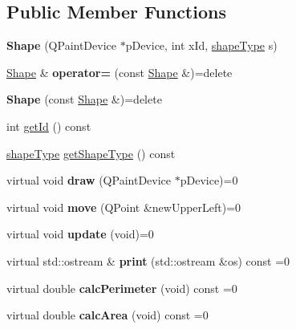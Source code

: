 \subsection*{Public Member Functions}
\begin{DoxyCompactItemize}
\item 
\hypertarget{classShape_a299b81fd56576b079f942a6a2c2f64e7}{{\bfseries Shape} (Q\-Paint\-Device $\ast$p\-Device, int x\-Id, \hyperlink{classShape_aaac58aa2f6760d0f06ec1710d5123e9b}{shape\-Type} s)}\label{classShape_a299b81fd56576b079f942a6a2c2f64e7}

\item 
\hypertarget{classShape_a9b9942917d6e6c359a8751156ed52423}{\hyperlink{classShape}{Shape} \& {\bfseries operator=} (const \hyperlink{classShape}{Shape} \&)=delete}\label{classShape_a9b9942917d6e6c359a8751156ed52423}

\item 
\hypertarget{classShape_a44d91c7621d4d7af60fe3320a2e07279}{{\bfseries Shape} (const \hyperlink{classShape}{Shape} \&)=delete}\label{classShape_a44d91c7621d4d7af60fe3320a2e07279}

\item 
int \hyperlink{classShape_a8783318515d368f9ba7b8f73a343e59b}{get\-Id} () const 
\item 
\hyperlink{classShape_aaac58aa2f6760d0f06ec1710d5123e9b}{shape\-Type} \hyperlink{classShape_a76eade96838eac557423a4ca8c0d9aef}{get\-Shape\-Type} () const 
\item 
\hypertarget{classShape_a0605dd98087b8566090acd67dc71eaa9}{virtual void {\bfseries draw} (Q\-Paint\-Device $\ast$p\-Device)=0}\label{classShape_a0605dd98087b8566090acd67dc71eaa9}

\item 
\hypertarget{classShape_a7314802497e54a2e3394eb5c9eacf06c}{virtual void {\bfseries move} (Q\-Point \&new\-Upper\-Left)=0}\label{classShape_a7314802497e54a2e3394eb5c9eacf06c}

\item 
\hypertarget{classShape_ad17bd222fddba504d2b995dede3ce1ba}{virtual void {\bfseries update} (void)=0}\label{classShape_ad17bd222fddba504d2b995dede3ce1ba}

\item 
\hypertarget{classShape_a3167ca12d1199e9f3a0d768c203658e8}{virtual std\-::ostream \& {\bfseries print} (std\-::ostream \&os) const =0}\label{classShape_a3167ca12d1199e9f3a0d768c203658e8}

\item 
\hypertarget{classShape_a7d01998091abdfeb3f0caa225abae8a1}{virtual double {\bfseries calc\-Perimeter} (void) const =0}\label{classShape_a7d01998091abdfeb3f0caa225abae8a1}

\item 
\hypertarget{classShape_a0cd5eee63d3be3431412bdb3929d9d5d}{virtual double {\bfseries calc\-Area} (void) const =0}\label{classShape_a0cd5eee63d3be3431412bdb3929d9d5d}

\end{DoxyCompactItemize}
